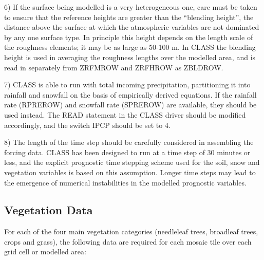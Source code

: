 6) If the surface being modelled is a very heterogeneous one, care must be taken to ensure that the reference heights are greater than the “blending height”, the distance above the surface at which the atmospheric variables are not dominated by any one surface type. In principle this height depends on the length scale of the roughness elements; it may be as large as 50-\/100 m. In C\+L\+A\+S\+S the blending height is used in averaging the roughness lengths over the modelled area, and is read in separately from Z\+R\+F\+M\+R\+O\+W and Z\+R\+F\+H\+R\+O\+W as Z\+B\+L\+D\+R\+O\+W.

7) C\+L\+A\+S\+S is able to run with total incoming precipitation, partitioning it into rainfall and snowfall on the basis of empirically derived equations. If the rainfall rate (R\+P\+R\+E\+R\+O\+W) and snowfall rate (S\+P\+R\+E\+R\+O\+W) are available, they should be used instead. The R\+E\+A\+D statement in the C\+L\+A\+S\+S driver should be modified accordingly, and the switch I\+P\+C\+P should be set to 4.

8) The length of the time step should be carefully considered in assembling the forcing data. C\+L\+A\+S\+S has been designed to run at a time step of 30 minutes or less, and the explicit prognostic time stepping scheme used for the soil, snow and vegetation variables is based on this assumption. Longer time steps may lead to the emergence of numerical instabilities in the modelled prognostic variables.\hypertarget{index_vegetationData}{}\subsection{Vegetation Data}\label{index_vegetationData}
For each of the four main vegetation categories (needleleaf trees, broadleaf trees, crops and grass), the following data are required for each mosaic tile over each grid cell or modelled area\+:


